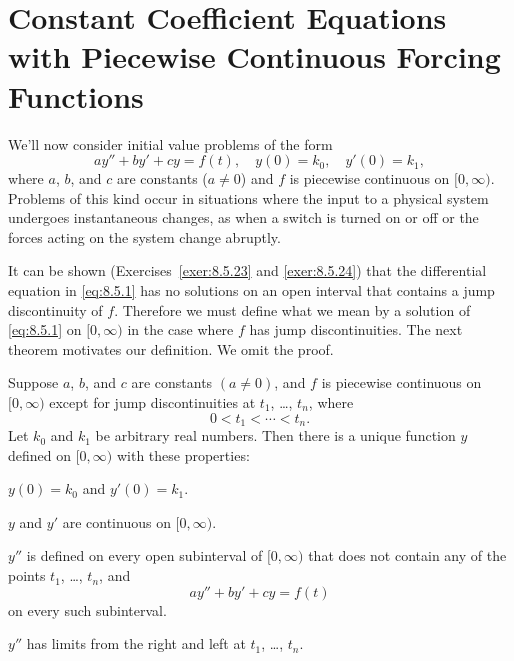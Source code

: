 \section{Constant Coefficient Equations with Piecewise Continuous Forcing Functions}

\noindent
We'll now consider initial value problems of the form
\begin{equation}
  \label{eq:8.5.1}ay''+by'+cy=f(t),\quad y(0)=k_{0},\quad y'(0)=k_{1},
\end{equation}
where $a$, $b$, and $c$ are constants ($a\ne0$) and $f$ is piecewise continuous on $[0,\infty)$.
Problems of this kind occur in situations where the input to a physical system undergoes
instantaneous changes, as when a switch is turned on or off or the forces acting on the system
change abruptly.

It can be shown (Exercises~\ref{exer:8.5.23} and \ref{exer:8.5.24}) that the differential equation
in \eqref{eq:8.5.1} has no solutions on an open interval that contains a jump discontinuity of $f$.
Therefore we must define what we mean by a solution of \eqref{eq:8.5.1} on $[0,\infty)$ in the case
where $f$ has jump discontinuities. The next theorem motivates our definition. We omit the proof.

\begin{theorem}
  \color{blue}
  \label{thmtype:8.5.1} Suppose $a$, $b$, and $c$ are constants $(a\ne0)$, and $f$ is piecewise
  continuous on $[0,\infty)$ except for jump discontinuities at $t_{1}$, \dots, $t_{n}$, where
  \[
    0<t_{1}<\cdots<t_{n}.
  \]
  Let $k_{0}$ and $k_{1}$ be arbitrary real numbers. Then there is a unique function $y$ defined on
  $[0,\infty)$ with these properties:
  \begin{alist}
    \item %
    $y(0)=k_{0}$ and $y'(0)=k_{1}$.

    \item %
    $y$ and $y'$ are continuous on $[0,\infty)$.

    \item %
    $y''$ is defined on every open subinterval of $[0,\infty)$ that does not contain any of the
    points $t_{1}$, \dots, $t_{n}$, and
    \[
      ay''+by'+cy=f(t)
    \]
    on every such subinterval.

    \item %
    $y''$ has limits from the right and left at $t_{1}$, \dots, $t_{n}$.
  \end{alist}
\end{theorem}


